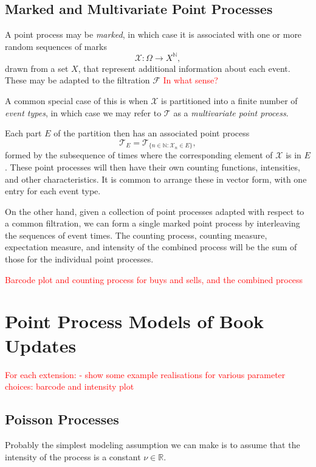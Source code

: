 \documentclass[honours,12pt]{unswthesis}
\numberwithin{equation}{section}
\begin{document}
\subsection{Marked and Multivariate Point Processes}

A point process  may be \textit{marked}, in which case it is associated with one or more random sequences of marks $$\mathcal{X}:\Omega\to X^\mathbb{N},$$
drawn from a set $X$, that represent additional information about each event. These may be adapted to the filtration $\mathcal{F}$ \textcolor{red}{In what sense?}

A common special case of this is when $\mathcal{X}$ is partitioned into a finite number of \textit{event types}, in which case we may refer to $\mathcal{T}$ as a \textit{multivariate point process}.

Each part $E$ of the partition then has an associated point process $$\mathcal{T}_E = \mathcal{T}_{\{n\in\mathbb{N} : \mathcal{X}_n\in E\}},$$ formed by the subsequence of times where the corresponding element of $\mathcal{X}$ is in $E$. These point processes will then have their own counting functions, intensities, and other characteristics. It is common to arrange these in vector form, with one entry for each event type.

On the other hand, given a collection of point processes adapted with respect to a common filtration, we can form a single marked point process by interleaving the sequences of event times. The counting process, counting measure, expectation measure, and intensity of the combined process will be the sum of those for the individual point processes.

\textcolor{red}{Barcode plot and counting process for buys and sells, and the combined process}



\section{Point Process Models of Book Updates}

\textcolor{red}{
For each extension:
- show some example realisations for various parameter choices: barcode and intensity plot
}


\subsection{Poisson Processes}
Probably the simplest modeling assumption we can make is to assume that the intensity of the process is a constant $\nu\in\mathbb{R}$.
\end{document}
